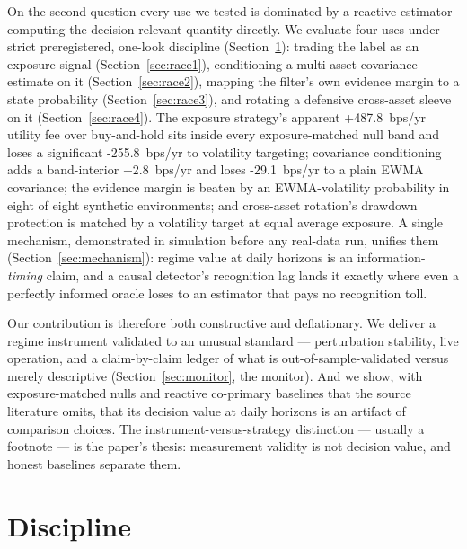 \documentclass[11pt]{article}
\newcommand{\aidraft}[1]{{\color{aidraftcolor}#1}} %
\newcommand{\aidraft}[1]{#1}
\newcommand{\feeJMBH}{+487.8}
\newcommand{\feeJMVT}{-255.8}
\newcommand{\feeAmatch}{+2.8}
\newcommand{\feeBreact}{-29.1}
\newcommand{\dgpCells}{eight of eight}
\begin{document}
\aidraft{%
On the second question every use we tested is dominated by a reactive estimator computing the
decision-relevant quantity directly.
We evaluate four uses under strict preregistered, one-look discipline (Section~\ref{sec:discipline}):
trading the label as an exposure signal (Section~\ref{sec:race1}), conditioning a multi-asset
covariance estimate on it (Section~\ref{sec:race2}), mapping the filter's own evidence margin to
a state probability (Section~\ref{sec:race3}), and rotating a defensive cross-asset sleeve on it
(Section~\ref{sec:race4}).
The exposure strategy's apparent \feeJMBH{}~bps/yr utility fee over buy-and-hold sits inside
every exposure-matched null band and loses a significant \feeJMVT{}~bps/yr to volatility
targeting; covariance conditioning adds a band-interior \feeAmatch{}~bps/yr and loses
\feeBreact{}~bps/yr to a plain EWMA covariance; the evidence margin is beaten by an EWMA-volatility
probability in \dgpCells{} synthetic environments; and cross-asset rotation's drawdown protection
is matched by a volatility target at equal average exposure.
A single mechanism, demonstrated in simulation before any real-data run, unifies them
(Section~\ref{sec:mechanism}): regime value at daily horizons is an information-\emph{timing}
claim, and a causal detector's recognition lag lands it exactly where even a perfectly informed
oracle loses to an estimator that pays no recognition toll.%
}

\aidraft{%
Our contribution is therefore both constructive and deflationary.
We deliver a regime instrument validated to an unusual standard --- perturbation stability, live
operation, and a claim-by-claim ledger of what is out-of-sample-validated versus merely
descriptive (Section~\ref{sec:monitor}, the monitor).
And we show, with exposure-matched nulls and reactive co-primary baselines that the source
literature omits, that its decision value at daily horizons is an artifact of comparison choices.
The instrument-versus-strategy distinction --- usually a footnote --- is the paper's thesis:
measurement validity is not decision value, and honest baselines separate them.%
}


\section{Discipline}
\label{sec:discipline}
\end{document}
